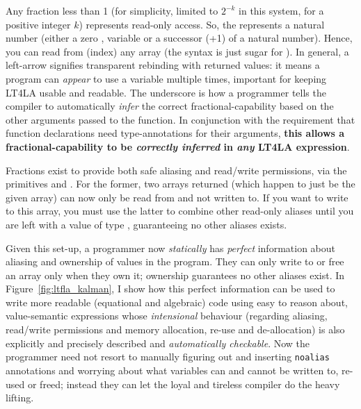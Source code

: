 Any fraction less than 1 (for simplicity, limited to $2^{-k}$ in this system,
for a positive integer $k$) represents read-only access. So, the 
represents a natural number (either a zero , variable  or a
successor (+1) of a natural number). Hence, you can read from (index) any array
 (the syntax  is just sugar for ). In general, a
left-arrow \ltfla{<-} signifies transparent rebinding with returned values: it
means a program can \emph{appear} to use a variable multiple times, important
for keeping LT4LA usable and readable. The underscore is how a programmer tells
the compiler to automatically \emph{infer} the correct fractional-capability
based on the other arguments passed to the function. In conjunction with the
requirement that function declarations need type-annotations for their
arguments, \textbf{this allows a fractional-capability to be \emph{correctly
inferred} in \emph{any} LT4LA expression}.

Fractions exist to provide both safe aliasing and read/write permissions, via
the primitives  and
.  For the former, two
arrays returned (which happen to just be the given array) can now only be read
from and not written to. If you want to write to this array, you must use the
latter to combine other read-only aliases until you are left with a value of
type , guaranteeing no other aliases exists.

Given this set-up, a programmer now \emph{statically} has \emph{perfect}
information about aliasing and ownership of values in the program. They can
only write to or free an array only when they own it; ownership guarantees no
other aliases exist. In Figure~\ref{fig:ltfla_kalman}, I show how this perfect
information can be used to write more readable (equational and algebraic) code
using easy to reason about, value-semantic expressions whose \emph{intensional}
behaviour (regarding aliasing, read/write permissions and memory allocation,
re-use and de-allocation)  is also explicitly and precisely described and
\emph{automatically checkable}. Now the programmer need not resort to manually
figuring out and inserting \texttt{noalias} annotations and worrying about what
variables can and cannot be written to, re-used or freed; instead they can let
the loyal and tireless compiler do the heavy lifting.

